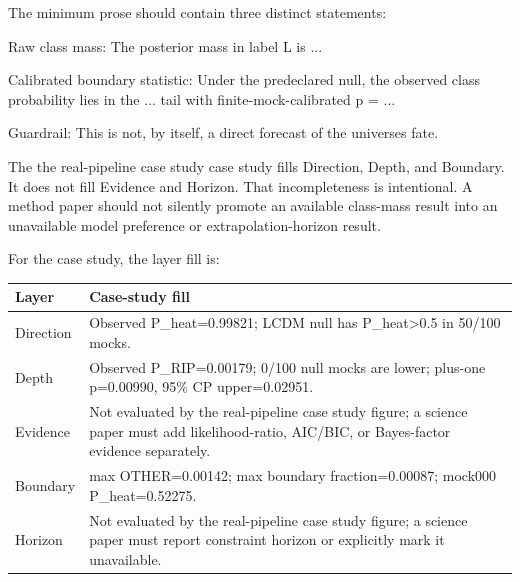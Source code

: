 \documentclass[
]{article}
\newenvironment{Shaded}{}{}
\newcommand{\NormalTok}[1]{#1}
\newcounter{none} %
\begin{document}
The minimum prose should contain three distinct statements:

\begin{Shaded}
\begin{Highlighting}[]
\NormalTok{Raw class mass:}
\NormalTok{The posterior mass in label L is ...}

\NormalTok{Calibrated boundary statistic:}
\NormalTok{Under the predeclared null, the observed class probability lies in the ...}
\NormalTok{tail with finite{-}mock{-}calibrated p = ...}

\NormalTok{Guardrail:}
\NormalTok{This is not, by itself, a direct forecast of the universe\textquotesingle{}s fate.}
\end{Highlighting}
\end{Shaded}

The the real-pipeline case study case study fills Direction, Depth, and
Boundary. It does not fill Evidence and Horizon. That incompleteness is
intentional. A method paper should not silently promote an available
class-mass result into an unavailable model preference or
extrapolation-horizon result.

For the case study, the layer fill is:

{\def\LTcaptype{none} %
\begin{longtable}[]{@{}
  >{\raggedright\arraybackslash}p{}
  >{\raggedright\arraybackslash}p{}@{}}
\toprule\noalign{}
\begin{minipage}[b]{\linewidth}\raggedright
Layer
\end{minipage} & \begin{minipage}[b]{\linewidth}\raggedright
Case-study fill
\end{minipage} \\
\midrule\noalign{}
\endhead
\bottomrule\noalign{}
\endlastfoot
Direction & Observed P\_heat=0.99821; LCDM null has
P\_heat\textgreater0.5 in 50/100 mocks. \\
Depth & Observed P\_RIP=0.00179; 0/100 null mocks are lower; plus-one
p=0.00990, 95\% CP upper=0.02951. \\
Evidence & Not evaluated by the real-pipeline case study figure; a
science paper must add likelihood-ratio, AIC/BIC, or Bayes-factor
evidence separately. \\
Boundary & max OTHER=0.00142; max boundary fraction=0.00087; mock000
P\_heat=0.52275. \\
Horizon & Not evaluated by the real-pipeline case study figure; a
science paper must report constraint horizon or explicitly mark it
unavailable. \\
\end{longtable}
}
\end{document}
